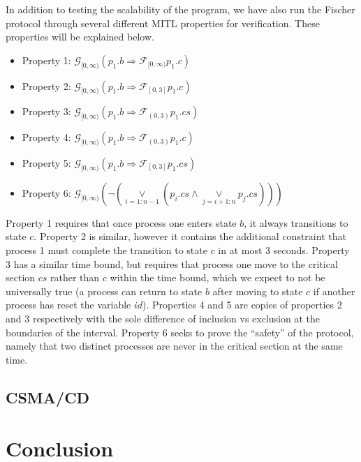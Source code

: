\documentclass[a4paper,12pt]{article}
\begin{document}
In addition to testing the scalability of the program, we have also run the
Fischer protocol through several different MITL properties for verification.
These properties will be explained below.

\begin{itemize}
\item Property 1: \(\mathcal{G}_{[0,\infty)} (p_1.b \Rightarrow \mathcal{F}_{[0,\infty)}p_1.c)\)
\item Property 2: \(\mathcal{G}_{[0,\infty)} (p_1.b \Rightarrow \mathcal{F}_{[0,3]}p_1.c)\)
\item Property 3: \(\mathcal{G}_{[0,\infty)} (p_1.b \Rightarrow \mathcal{F}_{(0,3)}p_1.cs)\)
\item Property 4: \(\mathcal{G}_{[0,\infty)} (p_1.b \Rightarrow \mathcal{F}_{(0,3)}p_1.c)\)
\item Property 5: \(\mathcal{G}_{[0,\infty)} (p_1.b \Rightarrow \mathcal{F}_{[0,3]}p_1.cs)\)
\item Property 6: \(\mathcal{G}_{[0,\infty)} (\neg (\underset{i=1:n-1}{\lor} (p_i.cs \land \underset{j=i+1:n}{\lor} p_j.cs )))\)
\end{itemize}


Property 1 requires that once process one enters state \(b\), it always
transitions to state \(c\). Property 2 is similar, however it contains the
additional constraint that process 1 must complete the transition to state \(c\)
in at most 3 seconds. Property 3 has a similar time bound, but requires that
process one move to the critical section \(cs\) rather than \(c\) within the
time bound, which we expect to not be universally true (a process can return to
state \(b\) after moving to state \(c\) if another process has reset the
variable \(id\)). Properties 4 and 5 are copies of properties 2 and 3
respectively with the sole difference of inclusion vs exclusion at the
boundaries of the interval. Property 6 seeks to prove the ``safety'' of the
protocol, namely that two distinct processes are never in the critical section
at the same time.

\subsection{CSMA/CD}
\label{sec:org7f3fd99}

\section{Conclusion}
\label{sec:orgd10da5e}
\end{document}
